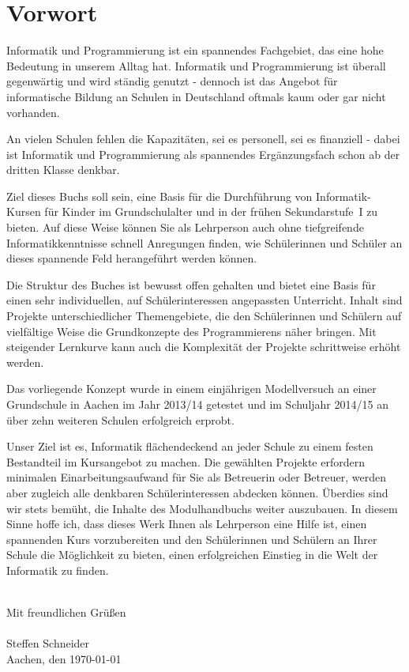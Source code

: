 \section*{Vorwort}
Informatik und Programmierung ist ein spannendes Fachgebiet, das eine hohe Bedeutung in unserem Alltag hat. Informatik und Programmierung ist überall gegenwärtig und wird ständig genutzt - dennoch ist das Angebot für informatische Bildung an Schulen in Deutschland oftmals kaum oder gar nicht vorhanden.

An vielen Schulen fehlen die Kapazitäten, sei es personell, sei es finanziell - dabei ist Informatik und Programmierung als spannendes Ergänzungsfach schon ab der dritten Klasse denkbar.

Ziel dieses Buchs soll sein, eine Basis für die Durchführung von Informatik-Kursen für Kinder im Grundschulalter und in der frühen Sekundarstufe~I zu bieten. Auf diese Weise können Sie als Lehrperson auch ohne tiefgreifende Informatikkenntnisse schnell Anregungen finden, wie Schülerinnen und Schüler an dieses spannende Feld herangeführt werden können.

Die Struktur des Buches ist bewusst offen gehalten und bietet eine Basis für einen sehr individuellen, auf Schülerinteressen angepassten Unterricht. Inhalt sind Projekte unterschiedlicher Themengebiete, die den Schülerinnen und Schülern auf vielfältige Weise die Grundkonzepte des Programmierens näher bringen. Mit steigender Lernkurve kann auch die Komplexität der Projekte schrittweise erhöht werden.

Das vorliegende Konzept wurde in einem einjährigen Modellversuch an einer Grundschule in Aachen im Jahr 2013/14 getestet und im Schuljahr 2014/15 an über zehn weiteren Schulen erfolgreich erprobt.

Unser Ziel ist es, Informatik flächendeckend an jeder Schule zu einem festen Bestandteil im Kursangebot zu machen. Die gewählten Projekte erfordern minimalen Einarbeitungsaufwand für Sie als Betreuerin oder Betreuer, werden aber zugleich alle denkbaren Schülerinteressen abdecken können. Überdies sind wir stets bemüht, die Inhalte des Modulhandbuchs weiter auszubauen.
\newpage
In diesem Sinne hoffe ich, dass dieses Werk Ihnen als Lehrperson eine Hilfe ist, einen spannenden Kurs vorzubereiten und den Schülerinnen und Schülern an Ihrer Schule die Möglichkeit zu bieten, einen erfolgreichen Einstieg in die Welt der Informatik zu finden.

\ \\Mit freundlichen Grüßen \\

\ \\Steffen Schneider\\
Aachen, den \today

